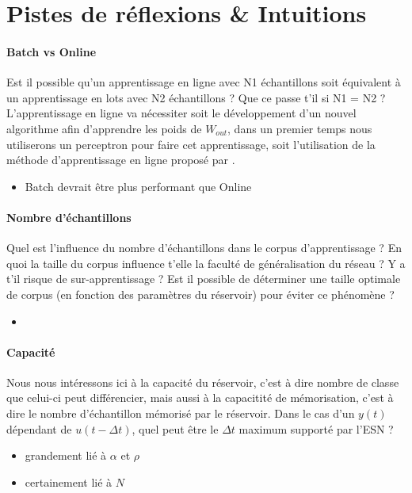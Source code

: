 \documentclass[12pt]{article}
\begin{document}
\section{Pistes de réflexions \& Intuitions}

\paragraph{Batch vs Online}
Est il possible qu'un apprentissage en ligne avec N1 échantillons soit équivalent à un apprentissage en lots avec N2 échantillons ? Que ce passe t'il si N1 = N2 ? L'apprentissage en ligne va nécessiter soit le développement d'un nouvel algorithme afin d'apprendre les poids de $W_{out}$, dans un premier temps nous utiliserons un perceptron pour faire cet apprentissage, soit l'utilisation de la méthode d'apprentissage en ligne proposé par \cite{Steil05}.

\begin{itemize}
\item Batch devrait être plus performant que Online
\end{itemize}

\paragraph{Nombre d'échantillons}
Quel est l'influence du nombre d'échantillons dans le corpus d'apprentissage ? En quoi la taille du corpus influence t'elle la faculté de généralisation du réseau ? Y a t'il risque de sur-apprentissage ? Est il possible de déterminer une taille optimale de corpus (en fonction des paramètres du réservoir) pour éviter ce phénomène ?

\begin{itemize}
\item 
\end{itemize}

\paragraph{Capacité}
Nous nous intéressons ici à la capacité du réservoir, c'est à dire nombre de classe que celui-ci peut différencier, mais aussi à la capacitité de mémorisation, c'est à dire le nombre d'échantillon mémorisé par le réservoir. Dans le cas d'un $y(t)$ dépendant de $u(t-\Delta t)$, quel peut être le $\Delta t$ maximum supporté par l'ESN ?

\begin{itemize}
\item grandement lié à $\alpha$ et $\rho$
\item certainement lié à $N$
\end{itemize}
\end{document}
